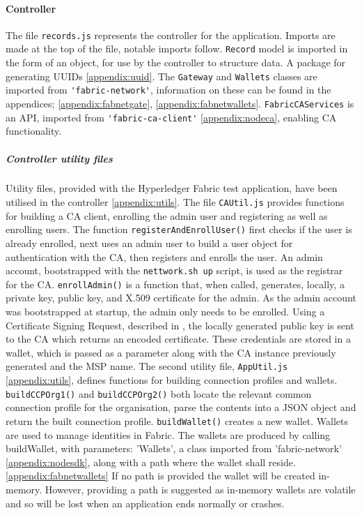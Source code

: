 \paragraph{Controller}
The file \lstinline{records.js} represents the controller for the application. 
Imports are made at the top of the file, notable imports follow. 
\lstinline{Record} model is imported in the form of an object, for use by the controller to structure data. 
A package for generating UUIDs \ref{appendix:uuid}. 
The \lstinline{Gateway} and \lstinline{Wallets} classes are imported from \lstinline{'fabric-network'}, information on these can be found in the appendices; \ref{appendix:fabnetgate}, \ref{appendix:fabnetwallets}. 
\lstinline{FabricCAServices} is an API, imported from \lstinline{'fabric-ca-client'} \ref{appendix:nodeca}, enabling CA functionality. 
\subparagraph{Controller utility files}
Utility files, provided with the Hyperledger Fabric test application, have been utilised in the controller \ref{appendix:utils}.
The file \lstinline{CAUtil.js} provides functions for building a CA client, enrolling the admin user and registering as well as enrolling users. 
The function \lstinline{registerAndEnrollUser()} first checks if the user is already enrolled, next uses an admin user to build a user object for authentication with the CA, then registers and enrolls the user.
An admin account, bootstrapped with the \lstinline{nettwork.sh up} script, is used as the registrar for the CA.
\lstinline{enrollAdmin()} is a function that, when called, generates, locally, a private key, public key, and X.509 certificate for the admin.
As the admin account was bootstrapped at startup, the admin only needs to be enrolled.
Using a Certificate Signing Request, described in \cite{noauthor_rfc2986_nodate}, the locally generated public key is sent to the CA which returns an encoded certificate. \cite{noauthor_running_nodate} 
These credentials are stored in a wallet, which is passed as a parameter along with the CA instance previously generated and the MSP name.  
The second utility file, \lstinline{AppUtil.js} \ref{appendix:utils}, defines functions for building connection profiles and wallets. 
\lstinline{buildCCPOrg1()} and \lstinline{buildCCPOrg2()} both locate the relevant common connection profile for the organisation, parse the contents into a JSON object and return the built connection profile. 
\lstinline{buildWallet()} creates a new wallet. 
Wallets are used to manage identities in Fabric. \cite{noauthor_wallet_nodate}
The wallets are produced by calling buildWallet, with parameters: 'Wallets', a class imported from 'fabric-network' \ref{appendix:nodesdk}, along with a path where the wallet shall reside. \ref{appendix:fabnetwallets}
If no path is provided the wallet will be created in-memory. However, providing a path is suggested as in-memory wallets are volatile and so will be lost when an application ends normally or crashes. \cite{noauthor_wallet_nodate}

